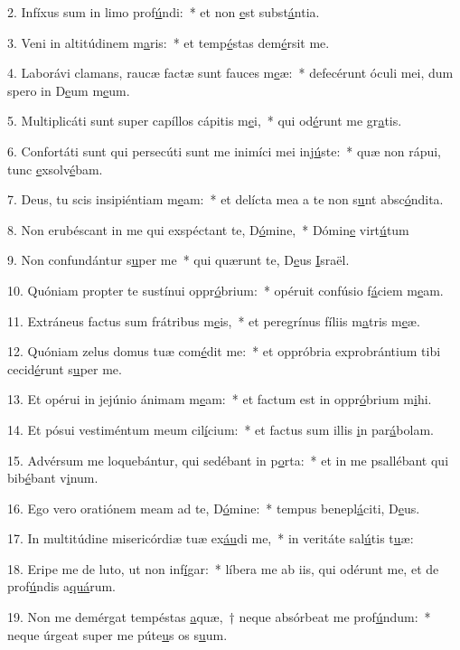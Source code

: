 2. Infíxus sum in limo prof\uline{ú}ndi:~* et non \uline{e}st subst\uline{á}ntia.\par 
3. Veni in altitúdinem m\uline{a}ris:~* et temp\uline{é}stas dem\uline{é}rsit me.\par 
4. Laborávi clamans, raucæ factæ sunt fauces m\uline{e}æ:~* defecérunt óculi mei, dum spero in D\uline{e}um m\uline{e}um.\par 
5. Multiplicáti sunt super capíllos cápitis m\uline{e}i,~* qui od\uline{é}runt me gr\uline{a}tis.\par 
6. Confortáti sunt qui persecúti sunt me inimíci mei inj\uline{ú}ste:~* quæ non rápui, tunc \uline{e}xsolv\uline{é}bam.\par 
7. Deus, tu scis insipiéntiam m\uline{e}am:~* et delícta mea a te non s\uline{u}nt absc\uline{ó}ndita.\par 
8. Non erubéscant in me qui exspéctant te, D\uline{ó}mine,~* Dómin\uline{e} virt\uline{ú}tum\par 
9. Non confundántur s\uline{u}per me~* qui quærunt te, D\uline{e}us \uline{I}sraël.\par 
10. Quóniam propter te sustínui oppr\uline{ó}brium:~* opéruit confúsio f\uline{á}ciem m\uline{e}am.\par 
11. Extráneus factus sum frátribus m\uline{e}is,~* et peregrínus fíliis m\uline{a}tris m\uline{e}æ.\par 
12. Quóniam zelus domus tuæ com\uline{é}dit me:~* et oppróbria exprobrántium tibi cecid\uline{é}runt s\uline{u}per me.\par 
13. Et opérui in jejúnio ánimam m\uline{e}am:~* et factum est in oppr\uline{ó}brium m\uline{i}hi.\par 
14. Et pósui vestiméntum meum cil\uline{í}cium:~* et factus sum illis \uline{i}n par\uline{á}bolam.\par 
15. Advérsum me loquebántur, qui sedébant in p\uline{o}rta:~* et in me psallébant qui bib\uline{é}bant v\uline{i}num.\par 
16. Ego vero oratiónem meam ad te, D\uline{ó}mine:~* tempus benepl\uline{á}citi, D\uline{e}us.\par 
17. In multitúdine misericórdiæ tuæ ex\uline{áu}di me,~* in veritáte sal\uline{ú}tis t\uline{u}æ:\par 
18. Eripe me de luto, ut non inf\uline{í}gar:~* líbera me ab iis, qui odérunt me, et de prof\uline{ú}ndis a\uline{quá}rum.\par 
19. Non me demérgat tempéstas \uline{a}quæ,~† neque absórbeat me prof\uline{ú}ndum:~* neque úrgeat super me púte\uline{u}s os s\uline{u}um.\par 
